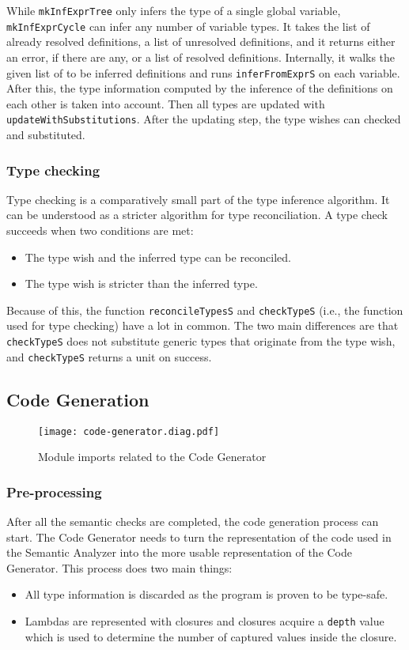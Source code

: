 \documentclass[12pt]{article}
\begin{document}
While \verb$mkInfExprTree$ only infers the type of a single global variable,
\verb$mkInfExprCycle$ can infer any number of variable types. It takes the list
of already resolved definitions, a list of unresolved definitions, and it
returns either an error, if there are any, or a list of resolved definitions.
Internally, it walks the given list of to be inferred definitions and runs
\verb$inferFromExprS$ on each variable. After this, the type information
computed by the inference of the definitions on each other is taken into
account. Then all types are updated with \verb$updateWithSubstitutions$. After
the updating step, the type wishes can checked and substituted.

\subsubsection{Type checking}

Type checking is a comparatively small part of the type inference algorithm. It
can be understood as a stricter algorithm for type reconciliation. A type check
succeeds when two conditions are met: 
\begin{itemize}
    \item The type wish and the inferred type can be reconciled.
    \item The type wish is stricter than the inferred type.
\end{itemize}
Because of this, the function \verb$reconcileTypesS$ and \verb$checkTypeS$
(i.e., the function used for type checking) have a lot in common. The two main
differences are that \verb$checkTypeS$ does not substitute generic types that
originate from the type wish, and \verb$checkTypeS$ returns a unit on success.

\subsection{Code Generation}

\begin{figure}[h]
\texttt{[image: code-generator.diag.pdf]}
\centering
\caption{Module imports related to the Code Generator}
\end{figure}
\subsubsection{Pre-processing}

After all the semantic checks are completed, the code generation process can
start. The Code Generator needs to turn the representation of the code used in
the Semantic Analyzer into the more usable representation of the Code Generator.
This process does two main things:
\begin{itemize}
    \item All type information is discarded as the program is proven to be
        type-safe.
    \item Lambdas are represented with closures and closures acquire a
        \verb$depth$ value which is used to determine the number of captured
        values inside the closure.
\end{itemize}
\end{document}
